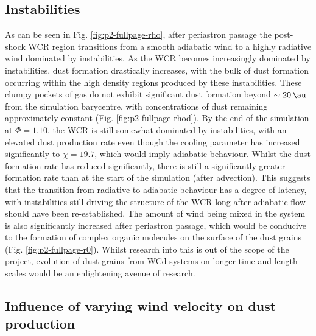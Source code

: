 \subsection{Instabilities}


As can be seen in Fig. \ref{fig:p2-fullpage-rho}, after periastron passage the post-shock WCR region transitions from a smooth adiabatic wind to a highly radiative wind dominated by instabilities.
As the WCR becomes increasingly dominated by instabilities, dust formation drastically increases, with the bulk of dust formation occurring within the high density regions produced by these instabilities.
These clumpy pockets of gas do not exhibit significant dust formation beyond $\sim \SI{20}{\au}$ from the simulation barycentre, with concentrations of dust remaining approximately constant (Fig. \ref{fig:p2-fullpage-rhod}).
By the end of the simulation at $\Phi = 1.10$, the WCR is still somewhat dominated by instabilities, with an elevated dust production rate even though the cooling parameter has increased significantly to $\chi = 19.7$, which would imply adiabatic behaviour.
Whilst the dust formation rate has reduced significantly, there is still a significantly greater formation rate than at the start of the simulation (after advection).
This suggests that the transition from radiative to adiabatic behaviour has a degree of latency, with instabilities still driving the structure of the WCR long after adiabatic flow should have been re-established.
The amount of wind being mixed in the system is also significantly increased after periastron passage, which would be conducive to the formation of complex organic molecules on the surface of the dust grains (Fig. \ref{fig:p2-fullpage-r0}).
Whilst research into this is out of the scope of the project, evolution of dust grains from WCd systems on longer time and length scales would be an enlightening avenue of research.

\subsection{Influence of varying wind velocity on dust production}


